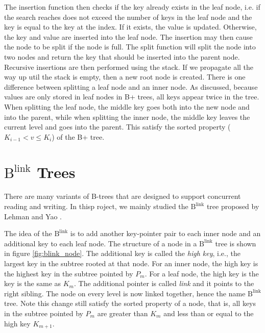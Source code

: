 \documentclass[twoside,11pt,openright]{report}
\theoremstyle{definition}
\begin{document}
The insertion function then checks if the key already exists in the leaf node, i.e. if the search reaches does not exceed the number of keys in the leaf node and the key is equal to the key at the index. If it exists, the value is updated. Otherwise, the key and value are inserted into the leaf node. The insertion may then cause the node to be split if the node is full. The split function will split the node into two nodes and return the key that should be inserted into the parent node. Recursive insertions are then performed using the stack. If we propagate all the way up util the stack is empty, then a new root node is created. There is one difference between splitting a leaf node and an inner node. As discussed, because values are only stored in leaf nodes in B+ trees, all keys appear twice in the tree. When splitting the leaf node, the middle key goes both into the new node and into the parent, while when splitting the inner node, the middle key leaves the current level and goes into the parent. This satisfy the sorted property ($K_{i-1} < v \leq K_i$) of the B+ tree.

\section{$\text{B}^{\text{link}}$ Trees}

There are many variants of B-trees that are designed to support concurrent reading and writing. In thisp roject, we mainly studied the $\text{B}^{\text{link}}$ tree proposed by Lehman and Yao \cite{10.1145/319628.319663}.

The idea of the $\text{B}^{\text{link}}$ is to add another key-pointer pair to each inner node and an additional key to each leaf node. The structure of a node in a $\text{B}^{\text{link}}$ tree is shown in figure \ref{fig:blink_node}. The additional key is called the \textit{high key}, i.e., the largest key in the subtree rooted at that node. For an inner node, the high key is the highest key in the subtree pointed by $P_m$. For a leaf node, the high key is the key is the same as $K_m$. The additional pointer is called \textit{link} and it points to the right sibling. The node on every level is now linked together, hence the name $\text{B}^{\text{link}}$ tree. Note this change still satisfy the sorted property of a node, that is, all keys in the subtree pointed by $P_m$ are greater than $K_m$ and less than or equal to the high key $K_{m+1}$.
\end{document}
